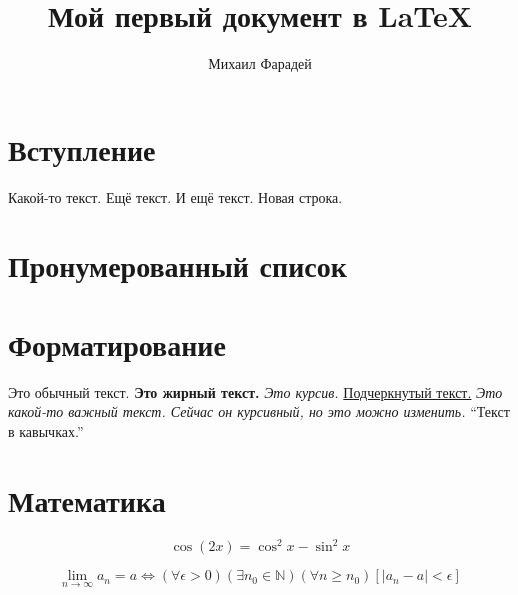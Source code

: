 \documentclass{article}
\author{Михаил Фарадей}
\title{Мой первый документ в {\LaTeX}}
\begin{document}
	\begin{titlepage}
		\maketitle
	\end{titlepage}

	\section{Вступление}
		Какой-то текст.
		Ещё текст.
		И ещё текст.
		\newline
		Новая строка.

	\section{Пронумерованный список}

	\section{Форматирование}
		Это обычный текст.
		\textbf{Это жирный текст.}
		\textit{Это курсив.}
		\underline{Подчеркнутый текст.}
		\newline
		\emph{Это какой-то важный текст. Сейчас он курсивный, но это можно изменить.}
		\newline
		``Текст в кавычках.''

	\section{Математика}
		\begin{equation*}
			\cos(2x) = \cos^2 x - \sin^2 x
		\end{equation*}

		\begin{equation*}
			\lim\limits_{n \to \infty} {a_n} = a
			\iff
			(\forall \epsilon > 0)
			(\exists n_0 \in \mathbb{N})
			(\forall n \geq n_0)
			[|a_n - a| < \epsilon]
		\end{equation*}
\end{document}
